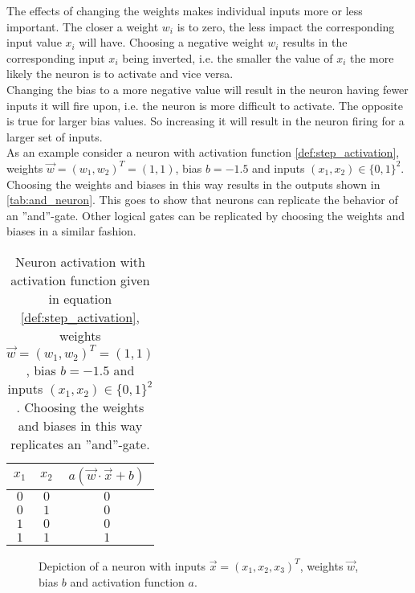 The effects of changing the weights makes individual inputs more or less important. The closer a weight $w_i$ is to zero, the less impact the corresponding input value $x_i$ will have. Choosing a negative weight $w_i$ results in the corresponding input $x_i$ being inverted, i.e. the smaller the value of $x_i$ the more likely the neuron is to activate and vice versa.\\
Changing the bias to a more negative value will result in the neuron having fewer inputs it will fire upon, i.e. the neuron is more difficult to activate. The opposite is true for larger bias values. So increasing it will result in the neuron firing for a larger set of inputs.\\
As an example consider a neuron with activation function \eqref{def:step_activation}, weights $\vec{w}={(w_1, w_2)}^T=(1, 1)$, bias $b=-1.5$ and inputs $(x_1,x_2)\in{\{0,1\}}^2$. Choosing the weights and biases in this way results in the outputs shown in \autoref{tab:and_neuron}. This goes to show that neurons can replicate the behavior of an ''and''-gate. Other logical gates can be replicated by choosing the weights and biases in a similar fashion.
\begin{table}
\begin{center}
\begin{tabular}{c c|c}
$x_1$ & $x_2$ & $a(\vec{w}\cdot\vec{x}+b)$\\
\hline
$0$ & $0$ & $0$\\
$0$ & $1$ & $0$\\
$1$ & $0$ & $0$\\
$1$ & $1$ & $1$\\
\end{tabular}
\caption[''OR''-neuron activations]{Neuron activation with activation function given in equation \eqref{def:step_activation}, weights $\vec{w}={(w_1, w_2)}^T=(1, 1)$, bias $b=-1.5$ and inputs $(x_1,x_2)\in{\{0,1\}}^2$. Choosing the weights and biases in this way replicates an ''and''-gate.}\label{tab:and_neuron}
\end{center}
\end{table}

\begin{figure}
\centering

\caption[Neuron]{Depiction of a neuron with inputs $\vec{x}={(x_1, x_2, x_3)}^T$, weights $\vec{w}$, bias $b$ and activation function $a$.}\label{fig:neuron}
\end{figure}

